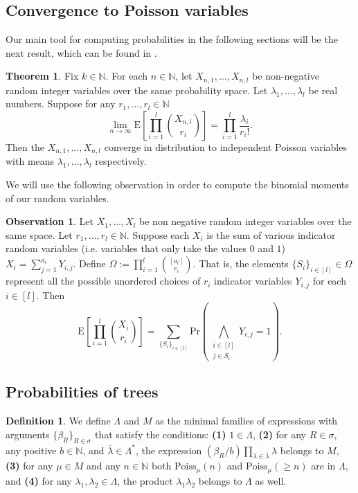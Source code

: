 \documentclass[12pt,notitlepage,a4paper]{article}
\theoremstyle{definition}
\newtheorem{theorem}{Theorem}[section]
\newtheorem{obs}{Observation}[section]
\newtheorem{definition}{Definition}[section]
\newcommand{\N}{\mathbb{N}}
\newcommand{\Ln}{\lim\limits_{n\to \infty}}
\begin{document}
\subsection{Convergence to Poisson variables}

Our main tool for computing probabilities in the following sections
will be the next result, which can
be found in \cite[Theorem 1.23]{bollobas2001random}.


\begin{theorem} \label{thm:BrunSieve}
	Fix $k\in \N$. For each 
	$n\in \N$, let $X_{n,1},\dots, X_{n,l}$ be non-negative
	random integer variables over the same
	probability space. Let $\lambda_1,\dots,\lambda_l$ 
	be real numbers. Suppose for any $r_1,\dots,r_l \in \N$
	\[ 
	\Ln \mathrm{E}\left[
	\prod_{i=1}^{l} \binom{X_{n,i}}{r_i} \right]
	= \prod_{i=1}^{l} \frac{\lambda_i}{r_i !}.	
	\]
	Then the $X_{n,1},\dots,X_{n,l}$ converge in distribution to
	independent Poisson variables with means $\lambda_1,\dots,\lambda_l$ 
	respectively. 
\end{theorem}

We will use the following observation in order to compute the binomial moments of 
our random variables.

\begin{obs} \label{obs:binomialmean} Let $X_1,\dots, X_l$ be non negative
	random integer variables over the same space. 
	Let $r_1,\dots,r_l\in \N$.	Suppose
	each $X_i$ is the sum of various indicator random variables
	(i.e. variables that only take the values $0$ and $1$)
	$X_i=\sum_{j=1}^{a_i} Y_{i,j}$. Define 
	$\Omega:=\prod_{i=1}^l \binom{[a_i]}{r_i}$. That is,
	the elements $\{S_i\}_{i\in[l]}\in \Omega$
	represent all the possible unordered choices of 
	$r_i$ indicator variables $Y_{i,j}$ for each $i\in [l]$.
	Then 
	\[
	\mathrm{E}\left[
	\prod_{i=1}^{l} \binom{X_i}{r_i}\right]=
	\sum_{\{S_i\}_{i\in [l]}} \mathrm{Pr}\left(
	\bigwedge_{\substack{i\in [l]\\ j\in S_i}} Y_{i,j}=1
	\right).	
	\]
\end{obs} 



\subsection{Probabilities of trees}

\begin{definition} \label{def:treeprobabilies}
We define $\Lambda$ and $M$ as the minimal families
of expressions with arguments $\{\beta_R\}_{R\in\sigma}$
that satisfy the conditions: \textbf{(1)}
$1\in \Lambda$, \textbf{(2)} 
for any $R\in \sigma$, any positive $b\in \N$,
and $\overline{\lambda} \in \Lambda^*$,
the expression $(\beta_R/b) \prod_{\lambda\in \overline{\lambda}}
\lambda$
belongs to $M$, \textbf{(3)}
for any $\mu\in M$ and any $n\in \N$ both
$\mathrm{Poiss}_{\mu}(n)$ and $\mathrm{Poiss}_\mu(\geq n)$ are in $\Lambda$, 
and  \textbf{(4)} for any $\lambda_1,\lambda_2 \in \Lambda$, the
product $\lambda_1\lambda_2$ belongs to $\Lambda$ as well.
\end{definition}
\end{document}
